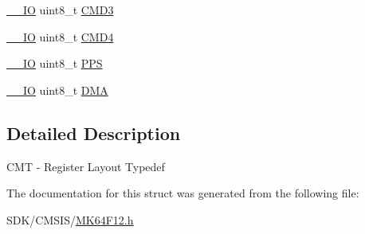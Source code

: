\begin{DoxyCompactItemize}
\item 
\mbox{\hyperlink{core__cm4_8h_aec43007d9998a0a0e01faede4133d6be}{\+\_\+\+\_\+\+IO}} uint8\+\_\+t \mbox{\hyperlink{group___v_r_e_f___peripheral___access___layer_ga63eadd8e8284c674163c9a0c7e33182e}{C\+M\+D3}}
\item 
\mbox{\hyperlink{core__cm4_8h_aec43007d9998a0a0e01faede4133d6be}{\+\_\+\+\_\+\+IO}} uint8\+\_\+t \mbox{\hyperlink{group___v_r_e_f___peripheral___access___layer_gadac134f6fa860ce95fa218a286ea09ef}{C\+M\+D4}}
\item 
\mbox{\hyperlink{core__cm4_8h_aec43007d9998a0a0e01faede4133d6be}{\+\_\+\+\_\+\+IO}} uint8\+\_\+t \mbox{\hyperlink{group___v_r_e_f___peripheral___access___layer_gae086b2bc67d37e48e34f64d9bc6ba5a2}{P\+PS}}
\item 
\mbox{\hyperlink{core__cm4_8h_aec43007d9998a0a0e01faede4133d6be}{\+\_\+\+\_\+\+IO}} uint8\+\_\+t \mbox{\hyperlink{group___v_r_e_f___peripheral___access___layer_ga87df1a716c395b3f3474710e434e41dc}{D\+MA}}
\end{DoxyCompactItemize}


\subsection{Detailed Description}
C\+MT -\/ Register Layout Typedef 

The documentation for this struct was generated from the following file\+:\begin{DoxyCompactItemize}
\item 
S\+D\+K/\+C\+M\+S\+I\+S/\mbox{\hyperlink{_m_k64_f12_8h}{M\+K64\+F12.\+h}}\end{DoxyCompactItemize}

